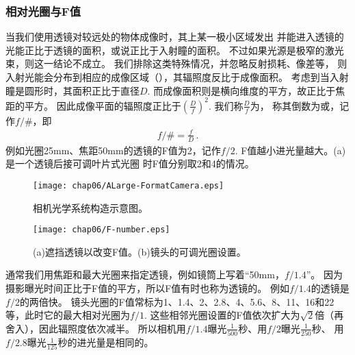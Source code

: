 \subsubsection{相对光圈与F值}
当我们使用透镜对较远处的物体成像时，其上某一极小区域发出
并能进入透镜的光能正比于透镜的面积，或说正比于入射瞳的面积。
不过如果光源是极窄的激光束，则这一结论不成立。
我们排除这类特殊情况，并忽略反射损耗、像差等，
则入射光能会分布到相应的成像区域（），其辐照度反比于成像面积。
考虑到当入射瞳是圆形时，其面积正比于直径$D$.
而成像面积则是横向维度的平方，故正比于焦距的平方。
因此成像平面的辐照度正比于$\displaystyle\left(\frac{D}{f}\right)^2$.
我们称$\displaystyle\frac{D}{f}$为，
称其倒数为或，记作$f/\#$，即
\begin{align}
    f/\#=\frac{f}{D}\, .
\end{align}
例如光圈25mm、焦距50mm的透镜的F值为2，记作$f/2$.
F值越小进光量越大。(a)是一个透镜后接可调叶片式光圈
时F值分别取2和4的情况。
\begin{figure}[htbp]
    \centering\texttt{[image: chap06/ALarge-FormatCamera.eps]}
    \caption{相机光学系统构造示意图。}
    \label{fig:6.52}
\end{figure}
\begin{figure}[htbp]
    \centering\texttt{[image: chap06/F-number.eps]}
    \caption{(a)遮挡透镜以改变F值。(b)镜头的可调光圈设置。}
    \label{fig:6.53}
\end{figure}

通常我们用焦距和最大光圈来指定透镜，例如镜筒上写着“50mm，$f/1.4$”。
因为摄影曝光时间正比于F值的平方，所以F值有时也称为透镜的。
例如$f/1.4$的透镜是$f/2$的两倍快。
镜头光圈的F值常标为1、1.4、2、2.8、4、5.6、8、11、16和22等，此时它的最大相对光圈为$f/1$.
这些相邻光圈设置的F值依次扩大为$\sqrt{2}$倍（再舍入），因此辐照度依次减半。
所以相机用$f/1.4$曝光$\displaystyle\frac{1}{500}$秒、用$f/2$曝光$\displaystyle\frac{1}{250}$秒、
用$f/2.8$曝光$\displaystyle\frac{1}{125}$秒的进光量是相同的。
